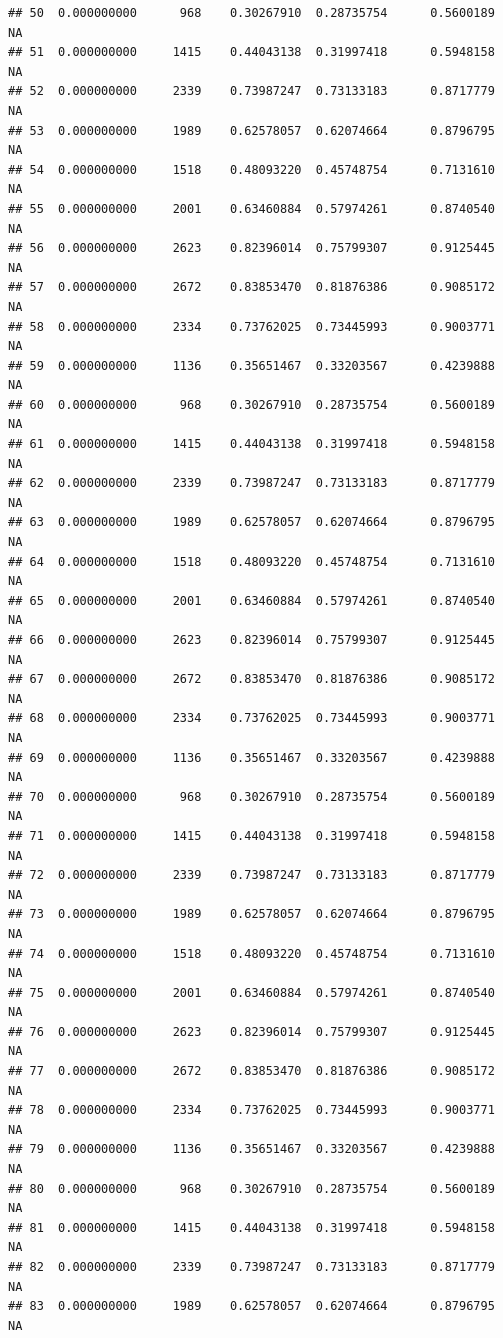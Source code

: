 \documentclass[
]{article}
\begin{document}
\begin{verbatim}
## 50  0.000000000      968    0.30267910  0.28735754      0.5600189      NA
## 51  0.000000000     1415    0.44043138  0.31997418      0.5948158      NA
## 52  0.000000000     2339    0.73987247  0.73133183      0.8717779      NA
## 53  0.000000000     1989    0.62578057  0.62074664      0.8796795      NA
## 54  0.000000000     1518    0.48093220  0.45748754      0.7131610      NA
## 55  0.000000000     2001    0.63460884  0.57974261      0.8740540      NA
## 56  0.000000000     2623    0.82396014  0.75799307      0.9125445      NA
## 57  0.000000000     2672    0.83853470  0.81876386      0.9085172      NA
## 58  0.000000000     2334    0.73762025  0.73445993      0.9003771      NA
## 59  0.000000000     1136    0.35651467  0.33203567      0.4239888      NA
## 60  0.000000000      968    0.30267910  0.28735754      0.5600189      NA
## 61  0.000000000     1415    0.44043138  0.31997418      0.5948158      NA
## 62  0.000000000     2339    0.73987247  0.73133183      0.8717779      NA
## 63  0.000000000     1989    0.62578057  0.62074664      0.8796795      NA
## 64  0.000000000     1518    0.48093220  0.45748754      0.7131610      NA
## 65  0.000000000     2001    0.63460884  0.57974261      0.8740540      NA
## 66  0.000000000     2623    0.82396014  0.75799307      0.9125445      NA
## 67  0.000000000     2672    0.83853470  0.81876386      0.9085172      NA
## 68  0.000000000     2334    0.73762025  0.73445993      0.9003771      NA
## 69  0.000000000     1136    0.35651467  0.33203567      0.4239888      NA
## 70  0.000000000      968    0.30267910  0.28735754      0.5600189      NA
## 71  0.000000000     1415    0.44043138  0.31997418      0.5948158      NA
## 72  0.000000000     2339    0.73987247  0.73133183      0.8717779      NA
## 73  0.000000000     1989    0.62578057  0.62074664      0.8796795      NA
## 74  0.000000000     1518    0.48093220  0.45748754      0.7131610      NA
## 75  0.000000000     2001    0.63460884  0.57974261      0.8740540      NA
## 76  0.000000000     2623    0.82396014  0.75799307      0.9125445      NA
## 77  0.000000000     2672    0.83853470  0.81876386      0.9085172      NA
## 78  0.000000000     2334    0.73762025  0.73445993      0.9003771      NA
## 79  0.000000000     1136    0.35651467  0.33203567      0.4239888      NA
## 80  0.000000000      968    0.30267910  0.28735754      0.5600189      NA
## 81  0.000000000     1415    0.44043138  0.31997418      0.5948158      NA
## 82  0.000000000     2339    0.73987247  0.73133183      0.8717779      NA
## 83  0.000000000     1989    0.62578057  0.62074664      0.8796795      NA

\end{verbatim}
\end{document}
